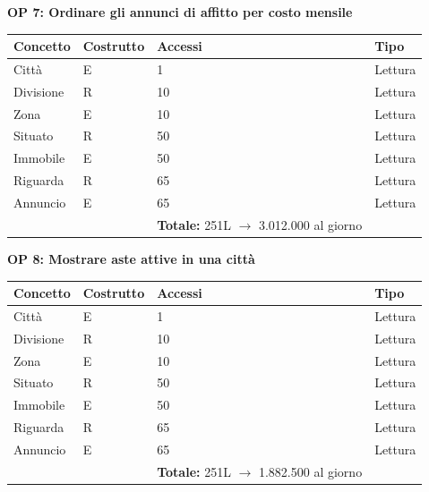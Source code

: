 \documentclass[a4paper,12pt]{report}
\begin{document}
            \textbf{OP 7: Ordinare gli annunci di affitto per costo mensile}
        	\begin{table}[H]
            \centering
             \begin{tabular}{llll}
             \rowcolor{yellow!20} \textbf{Concetto} & \textbf{Costrutto} & \textbf{Accessi} & \textbf{Tipo}\\ [0.5ex] 
             \hline
             Città & E & 1 & Lettura \\ 
             Divisione & R & 10 & Lettura \\ 
             Zona & E & 10 & Lettura \\ 
             Situato & R & 50 & Lettura \\ 
             Immobile & E & 50 & Lettura \\ 
             Riguarda & R & 65 & Lettura \\ 
             Annuncio & E & 65 & Lettura \\ 
             \hline
                \rowcolor{yellow!20} &   & \textbf{Totale:} 251L $\rightarrow$ 3.012.000 al giorno &  \\ [1ex] 
             
             \end{tabular}
            \end{table}

            \textbf{OP 8: Mostrare aste attive in una città}
        	\begin{table}[H]
            \centering
             \begin{tabular}{llll}
             \rowcolor{yellow!20} \textbf{Concetto} & \textbf{Costrutto} & \textbf{Accessi} & \textbf{Tipo}\\ [0.5ex] 
             \hline
             Città & E & 1 & Lettura \\ 
             Divisione & R & 10 & Lettura \\ 
             Zona & E & 10 & Lettura \\ 
             Situato & R & 50 & Lettura \\ 
             Immobile & E & 50 & Lettura \\ 
             Riguarda & R & 65 & Lettura \\ 
             Annuncio & E & 65 & Lettura \\ 
             \hline
                \rowcolor{yellow!20} &   & \textbf{Totale:} 251L $\rightarrow$ 1.882.500 al giorno &  \\ [1ex] 
             
             \end{tabular}
            \end{table}
\end{document}
